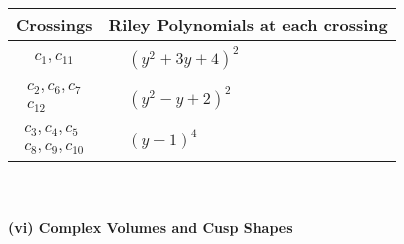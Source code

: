 \documentclass[1p]{elsarticle_modified}
\theoremstyle{definition}
\begin{document}
\begin{tabular}{m{50pt}|m{274pt}}
Crossings & \hspace{64pt}Riley Polynomials at each crossing \\
\hline $$\begin{aligned}c_{1},c_{11}\end{aligned}$$&$\begin{aligned}
&(y^2+3 y+4)^2
\end{aligned}$\\
\hline $$\begin{aligned}c_{2},c_{6},c_{7}\\c_{12}\end{aligned}$$&$\begin{aligned}
&(y^2- y+2)^2
\end{aligned}$\\
\hline $$\begin{aligned}c_{3},c_{4},c_{5}\\c_{8},c_{9},c_{10}\end{aligned}$$&$\begin{aligned}
&(y-1)^4
\end{aligned}$\\
\hline
\end{tabular}\\~\\
\newpage\flushleft \textbf{(vi) Complex Volumes and Cusp Shapes}
\end{document}

